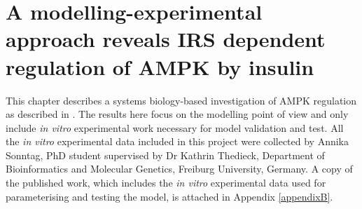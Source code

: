 \graphicspath{{Chapter6/Chapter6Figs/}}

\chapter{A modelling-experimental approach reveals IRS dependent regulation of AMPK by insulin}
\label{chap:A modelling-experimental approach reveals IRS dependent regulation of AMPK by insulin}
This chapter describes a systems biology-based investigation of AMPK regulation as described in \citep{Sonntag2012}. The results here focus on the modelling point of view and only include \emph{in vitro} experimental work necessary for model validation and test. All the \emph{in vitro} experimental data included in this project were collected by Annika Sonntag, PhD student supervised by Dr Kathrin Thedieck, Department of Bioinformatics and Molecular Genetics, Freiburg University, Germany. A copy of the published work, which includes the \emph{in vitro} experimental data used for parameterising and testing the model, is attached in Appendix \ref{appendixB}.


